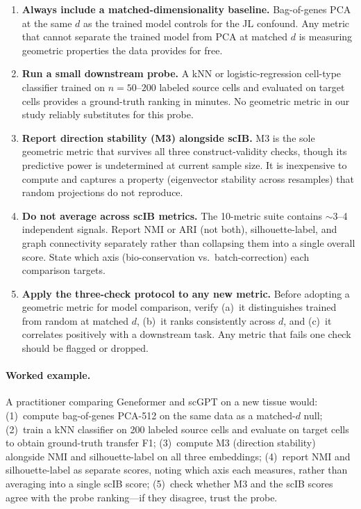 \documentclass[10pt,letterpaper]{article}
\begin{document}
\begin{enumerate}
\item \textbf{Always include a matched-dimensionality baseline.} Bag-of-genes PCA at the same $d$ as the trained model controls for the JL confound. Any metric that cannot separate the trained model from PCA at matched $d$ is measuring geometric properties the data provides for free.

\item \textbf{Run a small downstream probe.} A kNN or logistic-regression cell-type classifier trained on $n = 50$--$200$ labeled source cells and evaluated on target cells provides a ground-truth ranking in minutes. No geometric metric in our study reliably substitutes for this probe.

\item \textbf{Report direction stability (M3) alongside scIB.} M3 is the sole geometric metric that survives all three construct-validity checks, though its predictive power is undetermined at current sample size. It is inexpensive to compute and captures a property (eigenvector stability across resamples) that random projections do not reproduce.

\item \textbf{Do not average across scIB metrics.} The 10-metric suite contains $\sim$3--4 independent signals. Report NMI or ARI (not both), silhouette-label, and graph connectivity separately rather than collapsing them into a single overall score. State which axis (bio-conservation vs.\ batch-correction) each comparison targets.

\item \textbf{Apply the three-check protocol to any new metric.} Before adopting a geometric metric for model comparison, verify (a)~it distinguishes trained from random at matched $d$, (b)~it ranks consistently across $d$, and (c)~it correlates positively with a downstream task. Any metric that fails one check should be flagged or dropped.
\end{enumerate}

\paragraph{Worked example.} A practitioner comparing Geneformer and scGPT on a new tissue would: (1)~compute bag-of-genes PCA-512 on the same data as a matched-$d$ null; (2)~train a kNN classifier on 200 labeled source cells and evaluate on target cells to obtain ground-truth transfer F1; (3)~compute M3 (direction stability) alongside NMI and silhouette-label on all three embeddings; (4)~report NMI and silhouette-label as separate scores, noting which axis each measures, rather than averaging into a single scIB score; (5)~check whether M3 and the scIB scores agree with the probe ranking---if they disagree, trust the probe.
\end{document}
